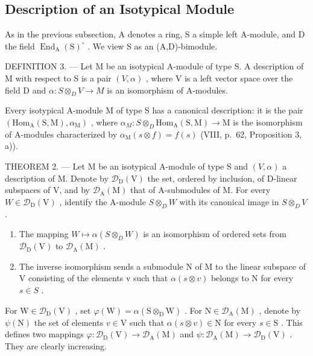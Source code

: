 \subsection{Description of an Isotypical Module}

As in the previous subsection, A denotes a ring, S a simple left A-module, and D the field \(\operatorname{End}_{\mathrm{A}}(\mathrm{S})^{\circ}\) . We view S as an (A,D)-bimodule.

DEFINITION 3. --- Let M be an isotypical A-module of type S. A description of M with respect to S is a pair \((V, \alpha)\) , where V is a left vector space over the field D and \(\alpha : S \otimes_{D} V \to M\) is an isomorphism of A-modules.

Every isotypical A-module M of type S has a canonical description: it is the pair \((\mathrm{Hom}_{\mathrm{A}}(\mathrm{S},\mathrm{M}),\alpha_{\mathrm{M}})\) , where \(\alpha_{M}:S\otimes_{D}\mathrm{Hom}_{\mathrm{A}}(\mathrm{S},\mathrm{M})\to\mathrm{M}\) is the isomorphism of A-modules characterized by \(\alpha_{\mathrm{M}}(s\otimes f)=f(s)\) (VIII, p.~62, Proposition 3, a)).

THEOREM 2. --- Let M be an isotypical A-module of type S and \((V,\alpha)\) a description of M. Denote by \(\mathcal{D}_{\mathrm{D}}(\mathrm{V})\) the set, ordered by inclusion, of D-linear subspaces of V, and by \(\mathcal{D}_{\mathrm{A}}(\mathrm{M})\) that of A-submodules of M. For every \(W \in \mathcal{D}_{\mathrm{D}}(\mathrm{V})\) , identify the A-module \(S \otimes_{D} W\) with its canonical image in \(S \otimes_{D} V\) .

\begin{enumerate}
\def\labelenumi{\alph{enumi})}
\item
  The mapping \(W \mapsto \alpha(S \otimes_{D} W)\) is an isomorphism of ordered sets from \(\mathcal{D}_{\mathrm{D}}(\mathrm{V})\) to \(\mathcal{D}_{\mathrm{A}}(\mathrm{M})\) .
\item
  The inverse isomorphism sends a submodule N of M to the linear subspace of V consisting of the elements v such that \(\alpha(s \otimes v)\) belongs to N for every \(s \in S\) .
\end{enumerate}

For \(\mathrm{W} \in \mathcal{D}_{\mathrm{D}}(\mathrm{V})\) , set \(\varphi(\mathrm{W}) = \alpha(\mathrm{S} \otimes_{\mathrm{D}} \mathrm{W})\) . For \(\mathrm{N} \in \mathcal{D}_{\mathrm{A}}(\mathrm{M})\) , denote by \(\psi(\mathrm{N})\) the set of elements \(v \in \mathrm{V}\) such that \(\alpha(s \otimes v) \in \mathrm{N}\) for every \(s \in \mathrm{S}\) . This defines two mappings \(\varphi: \mathcal{D}_{\mathrm{D}}(\mathrm{V}) \to \mathcal{D}_{\mathrm{A}}(\mathrm{M})\) and \(\psi: \mathcal{D}_{\mathrm{A}}(\mathrm{M}) \to \mathcal{D}_{\mathrm{D}}(\mathrm{V})\) . They are clearly increasing.


